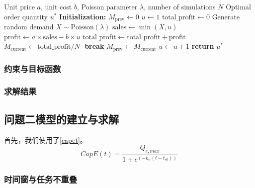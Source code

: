 \documentclass[withoutpreface,bwprint]{cumcmthesis}
\begin{document}
\begin{algorithm}[H]
\caption{Optimal Order Quantity Simulation for Newsvendor Problem}
\label{alg:newsvendor}
\begin{algorithmic}[1]
\Require Unit price $a$, unit cost $b$, Poisson parameter $\lambda$, number of simulations $N$
\Ensure Optimal order quantity $u^*$
\State \textbf{Initialization:}
\State $M_{\text{prev}} \gets 0$ 
\State $u \gets 1$ 
    \State $\text{total\_profit} \gets 0$
     
        \State Generate random demand $X \sim \text{Poisson}(\lambda)$
        \State $\text{sales} \gets \min(X, u)$
        \State $\text{profit} \gets a \times \text{sales} - b \times u$
        \State $\text{total\_profit} \gets \text{total\_profit} + \text{profit}$
    \EndFor
    \State $M_{\text{current}} \gets \text{total\_profit} / N$ 
        \State $ $ 
        \State \textbf{break} 
    \Else
        \State $M_{\text{prev}} \gets M_{\text{current}}$ 
        \State $u \gets u + 1$ 
    \EndIf
\EndWhile
\Statex
\State \textbf{return} $u^*$
\end{algorithmic}
\end{algorithm}

\subsubsection{约束与目标函数}

\subsubsection{求解结果}

\subsection{问题二模型的建立与求解}

首先，我们使用了\cref{capet}。
\begin{equation}\label{capet}
CapE(t)=\frac{Q_{e,max}}{1+e^{\!\left(-k_e\,(t-t_{e0})\right)}}
\end{equation}

\subsubsection{时间窗与任务不重叠}
\end{document}
